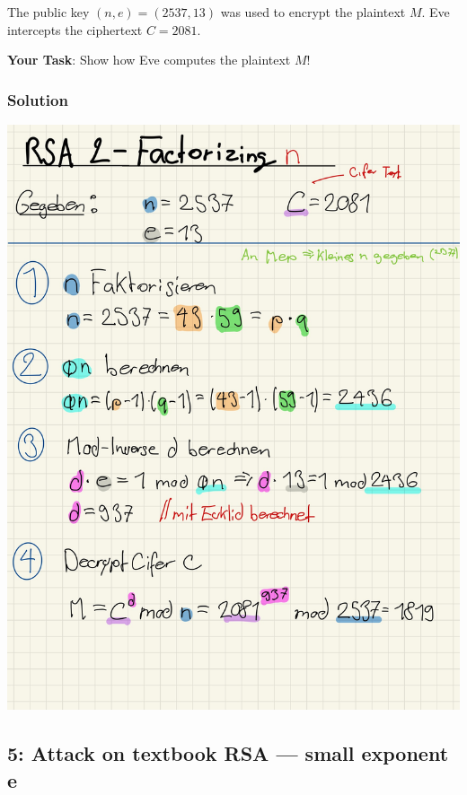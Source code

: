 \documentclass[11pt]{article}
\begin{document}
The public key \((n,e) = (2537,13)\) was used to encrypt the plaintext
\(M\). Eve intercepts the ciphertext \(C = 2081\).

\textbf{Your Task}: Show how Eve computes the plaintext \(M\)!

\hypertarget{solution}{%
\subsubsection{Solution}\label{solution}}

\begin{center}
	\includegraphics[scale=0.8]{img/rsa_2_factorizing.jpg}
\end{center}


    \hypertarget{attack-on-textbook-rsa-small-exponent-e}{%
\subsection{5: Attack on textbook RSA --- small exponent
e}\label{attack-on-textbook-rsa-small-exponent-e}}
\end{document}
